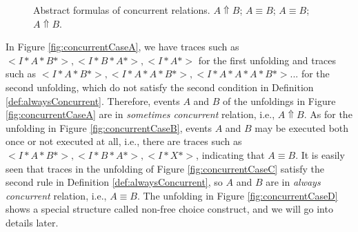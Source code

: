 \documentclass{llncs}
\begin{document}
\begin{figure}[ht]
{\begin{minipage}[b]{0.3\textwidth}
	\end{minipage}
	\label{fig:concurrentCaseC}
}
\caption{Abstract formulas of concurrent relations.  $A\Uparrow B$;  $A\equiv B$;  $A\equiv B$;  $A\Uparrow B$.\label{fig:concurrentCases}}
\end{figure}

In Figure \ref{fig:concurrentCaseA}, we have traces such as $<I*A*B*>,<I*B*A*>,<I*A*>$ for the first unfolding and traces such as $<I*A*B*>,<I*A*A*B*>,<I*A*A*A*B*>...$ for the second unfolding, which do not satisfy the second condition in Definition \ref{def:alwaysConcurrent}. Therefore, events $A$ and $B$ of the unfoldings in Figure \ref{fig:concurrentCaseA} are in \textit{sometimes concurrent} relation, i.e., $A\Uparrow B$. As for the unfolding in Figure \ref{fig:concurrentCaseB}, events $A$ and $B$ may be executed both once or not executed at all, i.e., there are traces such as $<I*A*B*>,<I*B*A*>,<I*X*>$, indicating that $A\equiv B$. It is easily seen that traces in the unfolding of Figure \ref{fig:concurrentCaseC} satisfy the second rule in Definition \ref{def:alwaysConcurrent}, so $A$ and $B$ are in \textit{always concurrent} relation, i.e., $A\equiv B$. The unfolding in Figure \ref{fig:concurrentCaseD} shows a special structure called non-free choice construct, and we will go into details later.
\end{document}
